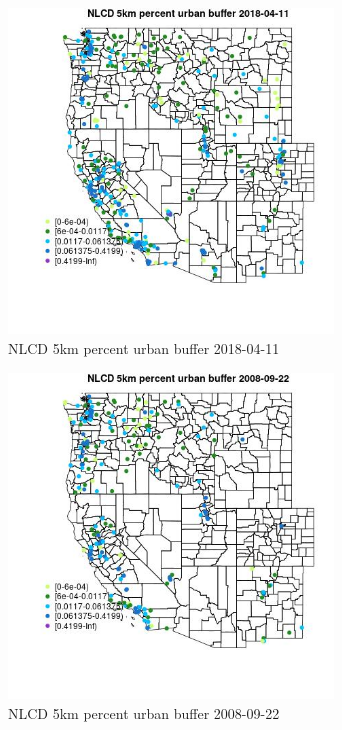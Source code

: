 \begin{figure} 
\centering  
\includegraphics[width=0.77\textwidth]{Code_Outputs/Report_ML_input_PM25_Step4_part_e_de_duplicated_aves_compiled_2019-05-18wNAs_MapObsNLCD_5km_percent_urban_buffer2018-04-11.jpg} 
\caption{\label{fig:Report_ML_input_PM25_Step4_part_e_de_duplicated_aves_compiled_2019-05-18wNAsMapObsNLCD_5km_percent_urban_buffer2018-04-11}NLCD 5km percent urban buffer 2018-04-11} 
\end{figure} 
 

\begin{figure} 
\centering  
\includegraphics[width=0.77\textwidth]{Code_Outputs/Report_ML_input_PM25_Step4_part_e_de_duplicated_aves_compiled_2019-05-18wNAs_MapObsNLCD_5km_percent_urban_buffer2008-09-22.jpg} 
\caption{\label{fig:Report_ML_input_PM25_Step4_part_e_de_duplicated_aves_compiled_2019-05-18wNAsMapObsNLCD_5km_percent_urban_buffer2008-09-22}NLCD 5km percent urban buffer 2008-09-22} 
\end{figure} 
 


